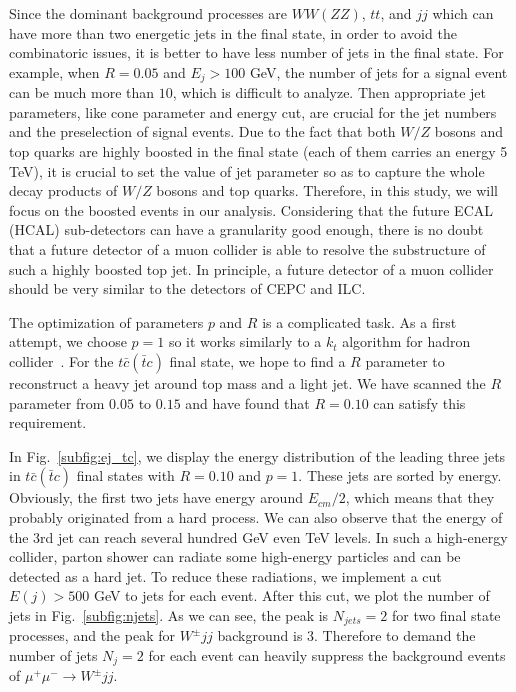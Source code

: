 \documentclass[a4paper,11pt]{article}
\begin{document}
Since the dominant background processes are $WW (ZZ)$, $tt$, 
and $jj$ which can have more than two energetic jets in the final state, 
in order to avoid the combinatoric issues, it is better to have less number of jets in the final state. 
For example, when $R=0.05$ and $E_j>100$ GeV,
the number of jets for a signal event can be much more than $10$, which is difficult to analyze. 
Then appropriate jet parameters, like cone parameter and energy cut, 
are crucial for the jet numbers and the preselection of signal events. 
Due to the fact that both $W/Z$ bosons and top quarks are highly boosted in the final state 
(each of them carries an energy 5 TeV), 
it is crucial to set the value of jet parameter so as to capture the whole decay products of $W/Z$ bosons and top quarks. Therefore, in this study, we will focus on the boosted events in our analysis. Considering that the future ECAL (HCAL) sub-detectors can have a granularity good enough,  there is no doubt that a future detector of a muon collider is able to resolve the substructure of such a highly boosted top jet. In principle, a future detector of a muon collider should be very similar to the detectors of CEPC and ILC.

The optimization of parameters $p$ and $R$ is a complicated task.
As a first attempt, we choose $p=1$ so it works similarly to a $k_t$ algorithm for hadron collider~\cite{Catani:1993hr,Ellis:1993tq}. 
For the $t\bar{c}(\bar{t}c)$ final state, we hope to find a $R$ parameter to reconstruct a heavy jet around top mass and a light jet.
We have scanned the $R$ parameter from $0.05$ to $0.15$ and have found that $R=0.10$ can satisfy this requirement. 

In Fig.~\ref{subfig:ej_tc}, we display the energy distribution of the leading three jets in $t\bar{c}(\bar{t}c)$ final states with $R=0.10$ and $p=1$. 
These jets are sorted by energy.  Obviously, the first two jets have energy around $E_{cm}/2$, 
which means that they probably originated from a hard process.
We can also observe that the energy of the 3rd jet can reach several hundred GeV even TeV levels.
In such a high-energy collider, parton shower can radiate some high-energy particles and can be detected as a hard jet. To reduce these radiations, we implement a cut $E(j)>500$ GeV to jets for each event. 
After this cut, we plot the number of jets in Fig.~\ref{subfig:njets}. 
As we can see, the peak is $N_{jets}=2$ for two final state processes, and the peak for $W^{\pm}jj$ background is 3. 
Therefore to demand the number of jets $N_j=2$ for each event can heavily suppress the background events of $\mu^+ \mu^- \to W^{\pm}jj$.
\end{document}
